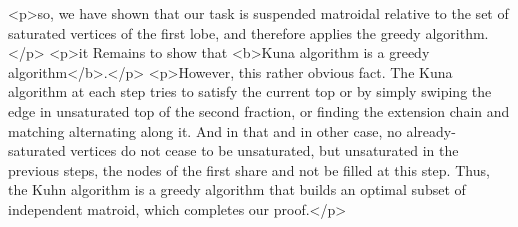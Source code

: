 <p>so, we have shown that our task is suspended matroidal relative to the set of saturated vertices of the first lobe, and therefore applies the greedy algorithm.</p>
<p>it Remains to show that <b>Kuna algorithm is a greedy algorithm</b>.</p>
<p>However, this rather obvious fact. The Kuna algorithm at each step tries to satisfy the current top or by simply swiping the edge in unsaturated top of the second fraction, or finding the extension chain and matching alternating along it. And in that and in other case, no already-saturated vertices do not cease to be unsaturated, but unsaturated in the previous steps, the nodes of the first share and not be filled at this step. Thus, the Kuhn algorithm is a greedy algorithm that builds an optimal subset of independent matroid, which completes our proof.</p>